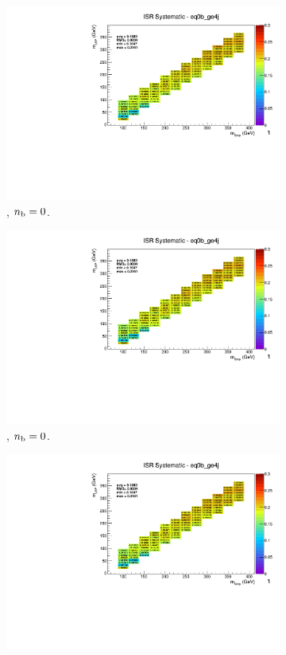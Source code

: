 \begin{figure}[ht!]
\begin{subfigure}[b]{0.32\textwidth}
    \includegraphics[width=\textwidth, page=12]{Figs/sms/t2degen/v19/systs_v2/T2_4body_ISR_eq0b_ge4j.pdf}
    \caption{\njhigh, $n_{\text{b}} = 0$.}
  \end{subfigure}
  \begin{subfigure}[b]{0.32\textwidth}
    \includegraphics[width=\textwidth, page=8]{Figs/sms/t2degen/v19/systs_v2/T2_4body_ISR_eq0b_ge4j.pdf}
    \caption{\njhigh, $n_{\text{b}} = 0$.}
  \end{subfigure}
  \begin{subfigure}[b]{0.32\textwidth}
    \includegraphics[width=\textwidth, page=1]{Figs/sms/t2degen/v19/systs_v2/T2_4body_ISR_eq0b_ge4j.pdf}

\end{subfigure}
\end{figure}
